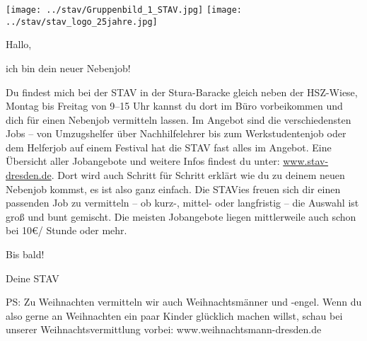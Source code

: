 \texttt{[image: ../stav/Gruppenbild\_1\_STAV.jpg]}
\hfill
\texttt{[image: ../stav/stav\_logo\_25jahre.jpg]}

Hallo,

ich bin dein neuer Nebenjob! 

Du findest mich bei der STAV in der Stura-Baracke gleich neben der HSZ-Wiese,
Montag bis Freitag von 9--15 Uhr kannst du dort im Büro vorbeikommen und
dich für einen Nebenjob vermitteln lassen.
Im Angebot sind die verschiedensten Jobs -- von Umzugshelfer über Nachhilfelehrer
bis zum Werkstudentenjob oder dem Helferjob auf einem Festival hat die STAV fast alles im Angebot.
Eine Übersicht aller Jobangebote und weitere Infos findest du unter:
\url{www.stav-dresden.de}.
Dort wird auch Schritt für Schritt erklärt wie du zu deinem neuen Nebenjob kommst,
es ist also ganz einfach.
Die STAVies freuen sich dir einen passenden Job zu vermitteln – ob kurz-, mittel- oder
langfristig – die Auswahl ist groß und bunt gemischt.
Die meisten Jobangebote liegen mittlerweile auch schon bei 10€/ Stunde oder mehr.

Bis bald!

Deine STAV

PS: Zu Weihnachten vermitteln wir auch Weihnachtsmänner und -engel.
Wenn du also gerne an Weihnachten ein paar Kinder glücklich machen willst,
schau bei unserer Weihnachtsvermittlung vorbei: www.weihnachtsmann-dresden.de





